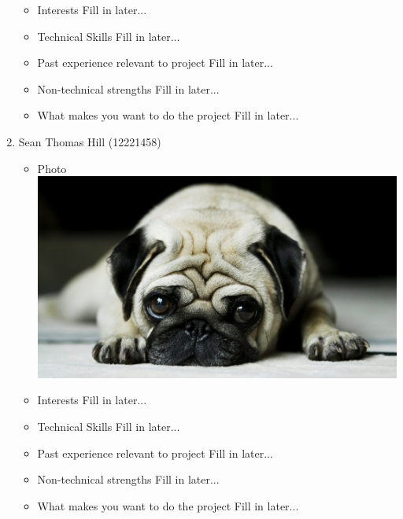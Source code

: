 \documentclass[12pt, oneside]{article}
\begin{document}
\begin{enumerate}
\begin{itemize}
			\item Interests\newline
				Fill in later...
			\item Technical Skills\newline
				Fill in later...
			\item Past experience relevant to project\newline
				Fill in later...
			\item Non-technical strengths\newline
				Fill in later...
			\item What makes you want to do the project\newline
				Fill in later...
		\end{itemize}
		\item {Sean Thomas Hill (12221458)\par}
		\begin{itemize}
			\item Photo\newline
				\includegraphics[scale=0.1]{example} %
			\item Interests\newline
				Fill in later...
			\item Technical Skills\newline
				Fill in later...
			\item Past experience relevant to project\newline
				Fill in later...
			\item Non-technical strengths\newline
				Fill in later...
			\item What makes you want to do the project\newline
				Fill in later...
		\end{itemize}

\end{enumerate}
\end{document}
